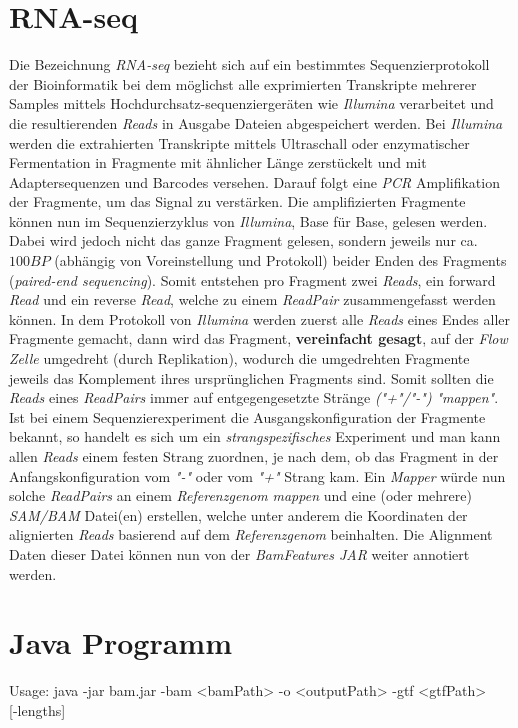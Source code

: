 \documentclass[12pt]{article}
\begin{document}
\section{RNA-seq}\label{sec:inro}
Die Bezeichnung \textit{RNA-seq} bezieht sich auf ein bestimmtes Sequenzierprotokoll der Bioinformatik bei dem
möglichst alle exprimierten Transkripte mehrerer Samples mittels Hochdurchsatz-sequenziergeräten wie
\textit{Illumina} verarbeitet und die resultierenden \textit{Reads} in Ausgabe Dateien abgespeichert werden.
Bei \textit{Illumina} werden die extrahierten Transkripte mittels Ultraschall oder enzymatischer Fermentation in Fragmente mit ähnlicher Länge
zerstückelt und mit Adaptersequenzen und Barcodes versehen. Darauf folgt eine \textit{PCR} Amplifikation der 
Fragmente, um das Signal zu verstärken. Die amplifizierten Fragmente können nun im Sequenzierzyklus 
von \textit{Illumina}, Base für Base, gelesen werden. Dabei wird jedoch nicht das ganze Fragment gelesen, sondern
jeweils nur ca. $100BP$ (abhängig von Voreinstellung und Protokoll) beider Enden des Fragments (\textit{paired-end sequencing}).
Somit entstehen pro Fragment zwei \textit{Reads}, ein forward \textit{Read} und ein reverse \textit{Read},
welche zu einem \textit{ReadPair} zusammengefasst werden können. 
In dem Protokoll von \textit{Illumina} werden zuerst alle \textit{Reads} eines Endes aller
Fragmente gemacht, dann wird das Fragment, \textbf{vereinfacht gesagt}, auf der \textit{Flow Zelle} umgedreht (durch Replikation), wodurch 
die umgedrehten Fragmente jeweils das Komplement ihres ursprünglichen Fragments sind.
Somit sollten die \textit{Reads} eines \textit{ReadPairs} immer auf entgegengesetzte Stränge \textit{("+"/"-")}
\textit{"mappen"}. Ist bei einem Sequenzierexperiment die Ausgangskonfiguration der Fragmente bekannt, so handelt 
es sich um ein \textit{strangspezifisches} Experiment und man kann allen
\textit{Reads} einem festen Strang zuordnen, je nach dem, ob das Fragment in der Anfangskonfiguration
vom \textit{"-"} oder vom \textit{"+"} Strang kam.
Ein \textit{Mapper} würde nun solche \textit{ReadPairs} an einem \textit{Referenzgenom} \textit{mappen}
und eine (oder mehrere) \textit{SAM/BAM} Datei(en) erstellen, welche unter anderem die Koordinaten der alignierten 
\textit{Reads} basierend auf dem \textit{Referenzgenom} beinhalten. 
Die Alignment Daten dieser Datei können nun von der \textit{BamFeatures JAR} weiter annotiert werden. 


\section{Java Programm}
\begin{verbatim*}
Usage:
    java -jar bam.jar -bam <bamPath> -o <outputPath> -gtf <gtfPath> \\
                      [-frstrand <true/false>] [-lengths]
\end{verbatim*}
\end{document}
